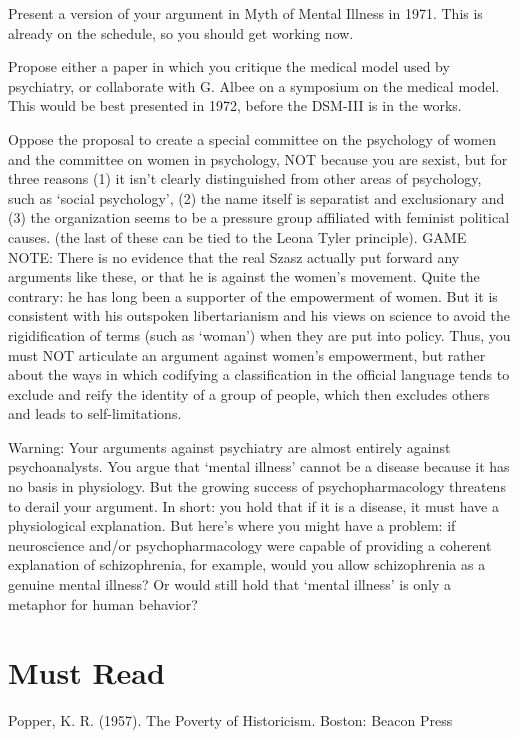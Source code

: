Present a version of your argument in Myth of Mental Illness in 1971. This is already on the schedule, so you should get working now.

Propose either a paper in which you critique the medical model used by psychiatry, or collaborate with G. Albee on a symposium on the medical model. This would be best presented in 1972, before the DSM-III is in the works.

Oppose the proposal to create a special committee on the psychology of women and the committee on women in psychology, NOT because you are sexist, but for three reasons (1) it isn't clearly distinguished from other areas of psychology, such as `social psychology', (2) the name itself is separatist and exclusionary and (3) the organization seems to be a pressure group affiliated with feminist political causes. (the last of these can be tied to the Leona Tyler principle). GAME NOTE: There is no evidence that the real Szasz actually put forward any arguments like these, or that he is against the women's movement. Quite the contrary: he has long been a supporter of the empowerment of women. But it is consistent with his outspoken libertarianism and his views on science to avoid the rigidification of terms (such as `woman') when they are put into policy. Thus, you must NOT articulate an argument against women's empowerment, but rather about the ways in which codifying a classification in the official language tends to exclude and reify the identity of a group of people, which then excludes others and leads to self-limitations.

Warning: Your arguments against psychiatry are almost entirely against psychoanalysts. You argue that `mental illness' cannot be a disease because it has no basis in physiology. But the growing success of psychopharmacology threatens to derail your argument. In short: you hold that if it is a disease, it must have a physiological explanation. But here's where you might have a problem: if neuroscience and\slash or psychopharmacology were capable of providing a coherent explanation of schizophrenia, for example, would you allow schizophrenia as a genuine mental illness? Or would still hold that `mental illness' is only a metaphor for human behavior?

\section{Must Read}
\label{mustread}

Popper, K. R. (1957). The Poverty of Historicism. Boston: Beacon Press

